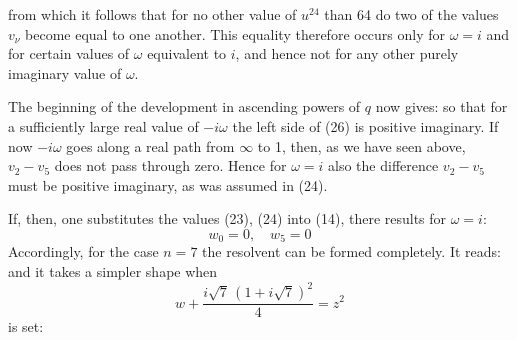 from which it follows that for no other value of $u^{24}$ than 64 do two
of the values $v_\nu$ become equal to one another. This equality therefore
occurs only for $\omega = i$ and for certain values of $\omega$ equivalent to $i$,
and hence not for any other purely imaginary value
of $\omega$.

The beginning of the development in ascending powers of
$q$ now gives:
so that for a sufficiently large real value of $-i\omega$ the
left side of (26) is positive imaginary. If now $-i\omega$ goes
along a real path from $\infty$ to 1, then, as we have seen above,
$v_2 - v_5$ does not pass through zero. Hence for $\omega = i$ also
the difference $v_2 - v_5$ must be positive imaginary, as was assumed
 in (24).

If, then, one substitutes the values (23), (24) into (14), there
results for $\omega = i$:
\[
w_0 = 0, \quad w_5 = 0
\]
Accordingly, for the case $n = 7$ the resolvent can be formed
completely. It reads:
and it takes a simpler shape when
\[
w + \frac{i\sqrt7\,(1+i\sqrt7)^2}{4} = z^2
\]
is set:
